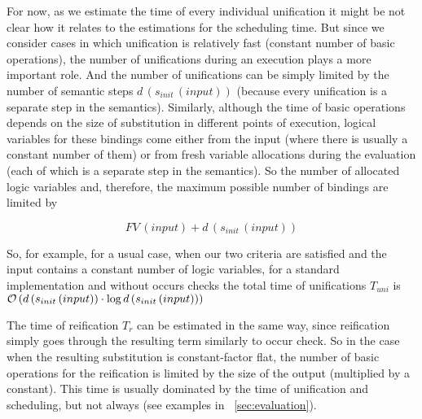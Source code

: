 For now, as we estimate the time of every individual unification it might be not clear how it relates to the estimations for the scheduling time. But since we consider cases in which unification
is relatively fast (constant number of basic operations), the number of unifications during an execution plays a more important role. And the number of unifications can be simply limited by the number of semantic
steps $d\,(s_{init}\,(input))$ (because every unification is a separate step in the semantics). Similarly, although the time of basic operations depends on the size of substitution in different points
of execution, logical variables for these bindings come either from the input (where there is usually a constant number of them) or from fresh variable allocations during the evaluation
(each of which is a separate step in the semantics). So the number of allocated logic variables and, therefore, the maximum possible number of bindings are limited by

\[
FV\,(input) + d\,(s_{init}\,(input))
\]

So, for example, for a usual case, when our two criteria are satisfied and the input contains a constant number of logic variables, for a standard implementation and without occurs checks
the total time of unifications $T_{uni}$ is $\mathcal{O}\,(d\,(s_{init}\,(input))\cdot \log d\,(s_{init}\,(input)))$

The time of reification $T_r$ can be estimated in the same way, since reification simply goes through the resulting term similarly to occur check. So in the case when the resulting
substitution is constant-factor flat, the number of basic operations for the reification is limited by the size of the output (multiplied by a constant). This time is usually dominated by the time of unification and scheduling, but not always (see examples in \sectionword~\ref{sec:evaluation}).

